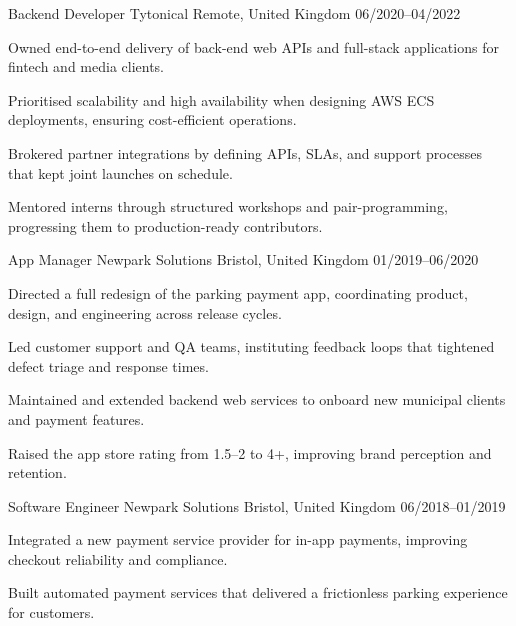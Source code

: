 \begin{cventries}
\cventry%
  {Backend Developer} %
  {Tytonical} %
  {Remote, United Kingdom} %
  {06/2020--04/2022} %
  {
    \begin{cvitems}
      \item Owned end-to-end delivery of back-end web APIs and full-stack applications for fintech and media clients.
      \item Prioritised scalability and high availability when designing AWS ECS deployments, ensuring cost-efficient operations.
      \item Brokered partner integrations by defining APIs, SLAs, and support processes that kept joint launches on schedule.
      \item Mentored interns through structured workshops and pair-programming, progressing them to production-ready contributors.
    \end{cvitems}
  }

  
\cventry%
  {App Manager} %
  {Newpark Solutions} %
  {Bristol, United Kingdom} %
  {01/2019--06/2020} %
  {
    \begin{cvitems}
      \item Directed a full redesign of the parking payment app, coordinating product, design, and engineering across release cycles.
      \item Led customer support and QA teams, instituting feedback loops that tightened defect triage and response times.
      \item Maintained and extended backend web services to onboard new municipal clients and payment features.
      \item Raised the app store rating from 1.5--2 to 4+, improving brand perception and retention.
    \end{cvitems}
  }

  
\cventry%
  {Software Engineer} %
  {Newpark Solutions} %
  {Bristol, United Kingdom} %
  {06/2018--01/2019} %
  {
    \begin{cvitems}
      \item Integrated a new payment service provider for in-app payments, improving checkout reliability and compliance.
      \item Built automated payment services that delivered a frictionless parking experience for customers.
    \end{cvitems}
  }


\end{cventries}